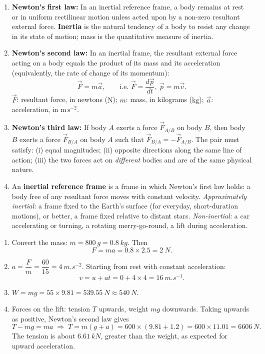 \documentclass[11pt]{article}
\begin{document}
\begin{corrige}
\begin{enumerate}
\item \textbf{Newton's first law:} In an inertial reference frame, a body remains at rest or in uniform rectilinear motion unless acted upon by a non-zero resultant external force. \textbf{Inertia} is the natural tendency of a body to resist any change in its state of motion; mass is the quantitative measure of inertia.
\item \textbf{Newton's second law:} In an inertial frame, the resultant external force acting on a body equals the product of its mass and its acceleration (equivalently, the rate of change of its momentum):
\[ \vec{F}=m\vec{a}, \qquad\text{i.e. } \vec{F}=\dfrac{d\vec{p}}{dt},\ \vec{p}=m\vec{v}. \]
$\vec{F}$: resultant force, in newtons ($\mathrm{N}$); $m$: mass, in kilograms ($\mathrm{kg}$); $\vec{a}$: acceleration, in $\mathrm{m\,s^{-2}}$.
\item \textbf{Newton's third law:} If body $A$ exerts a force $\vec{F}_{A/B}$ on body $B$, then body $B$ exerts a force $\vec{F}_{B/A}$ on body $A$ such that $\vec{F}_{B/A}=-\vec{F}_{A/B}$. The pair must satisfy: (i) equal magnitudes; (ii) opposite directions along the same line of action; (iii) the two forces act on \emph{different} bodies and are of the same physical nature.
\item An \textbf{inertial reference frame} is a frame in which Newton's first law holds: a body free of any resultant force moves with constant velocity. \emph{Approximately inertial:} a frame fixed to the Earth's surface (for everyday, short-duration motions), or better, a frame fixed relative to distant stars. \emph{Non-inertial:} a car accelerating or turning, a rotating merry-go-round, a lift during acceleration.
\end{enumerate}
\end{corrige}

\begin{corrige}
\begin{enumerate}
\item Convert the mass: $m=\SI{800}{g}=\SI{0.8}{kg}$. Then
\[ F=ma=0.8\times 2.5=\SI{2}{N}. \]
\item $a=\dfrac{F}{m}=\dfrac{60}{15}=\SI{4}{m.s^{-2}}$. Starting from rest with constant acceleration:
\[ v=u+at=0+4\times 4=\SI{16}{m.s^{-1}}. \]
\item $W=mg=55\times 9.81=\SI{539.55}{N}\approx\SI{540}{N}$.
\item Forces on the lift: tension $T$ upwards, weight $mg$ downwards. Taking upwards as positive, Newton's second law gives
\[ T-mg=ma \;\Longrightarrow\; T=m(g+a)=600\times(9.81+1.2)=600\times 11.01=\SI{6606}{N}. \]
The tension is about $\SI{6.61}{kN}$, greater than the weight, as expected for upward acceleration.
\end{enumerate}
\end{corrige}
\end{document}
